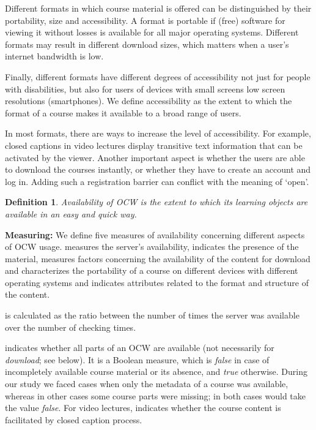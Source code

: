 \documentclass{sig-alternate}
\theoremstyle{definition}
\newtheorem{defn}{Definition}
\begin{document}
Different formats in which course material is offered can be distinguished by their portability, size and accessibility.
A format is portable if (free) software for viewing it without losses is available for all major operating systems.
Different formats may result in different download sizes, which matters when a user's internet bandwidth is low.

Finally, different formats have different degrees of accessibility not just for people with disabilities, but also for users of devices with small screens low screen resolutions (smartphones).
We define accessibility as the extent to which the format of a course makes it available to a broad range of users.

In most formats, there are ways to increase the level of accessibility.
For example, closed captions in video lectures display transitive text information that can be activated by the viewer.
Another important aspect is whether the users are able to download the courses instantly, or whether they have to create an account and log in.
Adding such a registration barrier can conflict with the meaning of `open'.

\begin{defn}
\emph {Availability of OCW is the extent to which its learning objects are available in an easy and quick way.}
\end{defn}

\noindent\textbf{Measuring:}
We define five measures of availability concerning different aspects of OCW usage.
 measures the server's availability,  indicates the presence of the material,  measures factors concerning the availability of the content for download and  characterizes the portability of a course on different devices with different operating systems and
 indicates attributes related to the format and structure of the content.

 is calculated as the ratio between the number of times the server was available over the number of checking times.

 indicates whether all parts of an OCW are available (not necessarily for \emph{download}; see  below).
It is a Boolean measure, which is \emph{false} in case of incompletely available course material or its absence, and \emph{true} otherwise.
During our study we faced cases when only the metadata of a course was available, whereas in other cases some course parts were missing; in both cases  would take the value \emph{false}.
For video lectures,  indicates whether the course content is facilitated by closed caption process.
\end{document}
